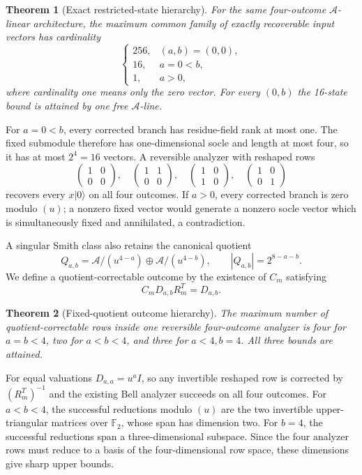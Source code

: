 \documentclass[11pt]{article}
\newtheorem{theorem}{Theorem}
\newcommand{\A}{\mathcal A}
\newcommand{\F}{\mathbb F}
\newcommand{\ket}[1]{\lvert #1\rangle}
\begin{document}
\begin{theorem}[Exact restricted-state hierarchy]
For the same four-outcome $\A$-linear architecture, the maximum common family
of exactly recoverable input vectors has cardinality
\[
\begin{cases}
256,&(a,b)=(0,0),\\
16,&a=0<b,\\
1,&a>0,
\end{cases}
\]
where cardinality one means only the zero vector.  For every $(0,b)$ the
16-state bound is attained by one free $\A$-line.
\end{theorem}

For $a=0<b$, every corrected branch has residue-field rank at most one.  The
fixed submodule therefore has one-dimensional socle and length at most four,
so it has at most $2^4=16$ vectors.  A reversible analyzer with reshaped rows
\[
\begin{pmatrix}1&0\\0&0\end{pmatrix},\quad
\begin{pmatrix}1&1\\0&0\end{pmatrix},\quad
\begin{pmatrix}1&0\\1&0\end{pmatrix},\quad
\begin{pmatrix}1&0\\0&1\end{pmatrix}
\]
recovers every $x\ket0$ on all four outcomes.  If $a>0$, every corrected
branch is zero modulo $(u)$; a nonzero fixed vector would generate a nonzero
socle vector which is simultaneously fixed and annihilated, a contradiction.

A singular Smith class also retains the canonical quotient
\[
Q_{a,b}=\A/(u^{4-a})\oplus\A/(u^{4-b}),\qquad
|Q_{a,b}|=2^{8-a-b}.
\]
We define a quotient-correctable outcome by the existence of $C_m$ satisfying
\[
C_mD_{a,b}R_m^T=D_{a,b}.
\]

\begin{theorem}[Fixed-quotient outcome hierarchy]
The maximum number of quotient-correctable rows inside one reversible
four-outcome analyzer is four for $a=b<4$, two for $a<b<4$, and three for
$a<4,b=4$.  All three bounds are attained.
\end{theorem}

For equal valuations $D_{a,a}=u^aI$, so any invertible reshaped row is
corrected by $(R_m^T)^{-1}$ and the existing Bell analyzer succeeds on all
four outcomes.  For $a<b<4$, the successful reductions modulo $(u)$ are the
two invertible upper-triangular matrices over $\F_2$, whose span has dimension
two.  For $b=4$, the successful reductions span a three-dimensional subspace.
Since the four analyzer rows must reduce to a basis of the four-dimensional
row space, these dimensions give sharp upper bounds.
\end{document}
